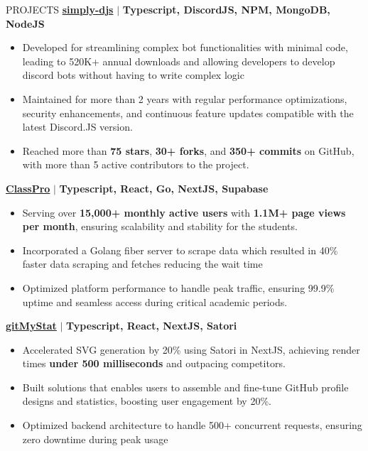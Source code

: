 \documentclass{resume} %
\begin{document}
\begin{rSection}{PROJECTS}    
    \textbf{\href{https://github.com/Rahuletto/simply-djs}{simply-djs}} \(\mid\) \textbf{Typescript, DiscordJS, NPM, MongoDB, NodeJS}
\begin{itemize}
\itemsep -3pt{}
\item Developed for streamlining complex bot functionalities with minimal code, leading to 520K+ annual downloads and allowing developers to develop discord bots without having to write complex logic
\item Maintained for more than 2 years with regular performance optimizations, security enhancements, and continuous feature updates compatible with the latest Discord.JS version.
\item Reached more than \textbf{75 stars}, \textbf{30+ forks}, and \textbf{350+ commits} on GitHub, with more than 5 active contributors to the project.
\end{itemize}
\textbf{\href{https://github.com/Rahuletto/ClassPro}{ClassPro}} \(\mid\) \textbf{Typescript, React, Go, NextJS, Supabase}
\begin{itemize}
\itemsep -3pt{}
\item Serving over \textbf{15,000+ monthly active users} with \textbf{1.1M+ page views per month}, ensuring scalability and stability for the students.
\item Incorporated a Golang fiber server to scrape data which resulted in 40\% faster data scraping and fetches reducing the wait time
\item Optimized platform performance to handle peak traffic, ensuring 99.9\% uptime and seamless access during critical academic periods.
\end{itemize}
\textbf{\href{https://github.com/Rahuletto/gitMyStat}{gitMyStat}} \(\mid\) \textbf{Typescript, React, NextJS, Satori}
\begin{itemize}
\itemsep -3pt{}
\item Accelerated SVG generation by 20\% using Satori in NextJS, achieving render times \textbf{under 500 milliseconds} and outpacing competitors.
\item Built solutions that enables users to assemble and fine-tune GitHub profile designs and statistics, boosting user engagement by 20\%.
\item Optimized backend architecture to handle 500+ concurrent requests, ensuring zero downtime during peak usage
\end{itemize}
\end{rSection}
\end{document}
